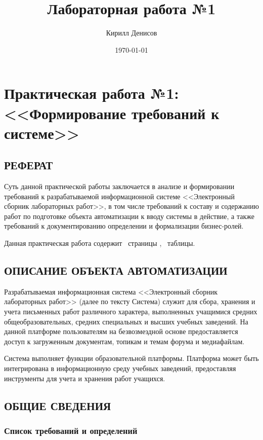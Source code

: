 \documentclass[a4paper,14pt]{extarticle}
\author{Кирилл Денисов}
\title{Лабораторная работа №1}
\date{\today}
\newcommand{\pathToCommonFolder}{/home/denilai/Documents/repos/latex/Common}
\begin{document}
	\thispagestyle{empty}
	
	\newpage
	\tableofcontents
	\newpage
	
\normalsize

\section{Практическая работа №1: <<Формирование требований к системе>>}
\subsection{РЕФЕРАТ}
Суть данной практической работы заключается в анализе и формировании требований к разрабатываемой информационной системе <<Электронный сборник лабораторных работ>>, в том числе требований к составу и содержанию работ по подготовке объекта автоматизации к вводу системы в действие, а также требований к документированию определении и формализации бизнес-ролей.

Данная практическая работа содержит
\pageref*{LastPage}~страницы
, \tottab~таблицы.

\newpage
\subsection{ОПИСАНИЕ ОБЪЕКТА АВТОМАТИЗАЦИИ}

Разрабатываемая информационная система <<Электронный сборник лабораторных работ>> (далее по тексту Система) служит для сбора, хранения и учета письменных работ различного характера, выполненных учащимися средних общеобразовательных, средних специальных и высших учебных заведений. На данной платформе пользователям на безвозмездной основе предоставляется доступ к загруженным документам, топикам и темам форума и медиафайлам. 

Система выполняет функции образовательной платформы. Платформа может быть интегрирована в информационную среду учебных заведений, предоставляя инструменты для учета и хранения работ учащихся. 

\newpage
\subsection{ОБЩИЕ СВЕДЕНИЯ}
\subsubsection{Список требований и определений}
\end{document}

